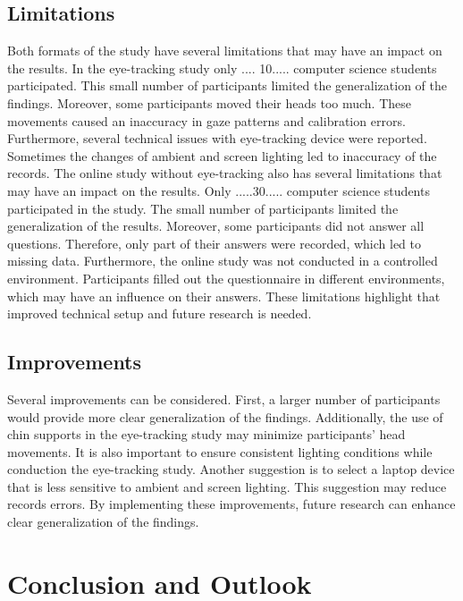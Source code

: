 \section{Limitations} 
Both formats of the study have several limitations that may have an impact on the results.
In the eye-tracking study only .... 10..... computer science students participated.  This small number of participants limited the generalization of the findings.  Moreover, some participants moved their heads too much.  These movements caused an inaccuracy in gaze patterns and calibration errors. Furthermore, several technical issues with eye-tracking device were reported. Sometimes the changes of ambient and screen lighting led to inaccuracy of the records.
The online study without eye-tracking also has several limitations that may have an impact on the results. 
Only .....30..... computer science students participated in the study. The small number of participants limited the generalization of the results. 
Moreover, some participants did not answer all questions. Therefore, only part of their answers were recorded, which led to missing data. 
Furthermore, the online study was not conducted in a controlled environment. Participants filled out the questionnaire in different environments, which may have an influence on their answers.  
These limitations highlight that improved technical setup and future research is needed. 


\section{Improvements}

Several improvements can be considered. First, a larger number of participants would provide more clear generalization of the findings. Additionally, the use of chin supports in the eye-tracking study may minimize participants’ head movements. It is also important to ensure consistent lighting conditions while conduction the eye-tracking study. Another suggestion is to select a laptop device that is less sensitive to ambient and screen lighting. This suggestion may reduce records errors. By implementing these improvements, future research can enhance clear generalization of the findings. 

\chapter{Conclusion and Outlook}
\label{sec:conclusion}
